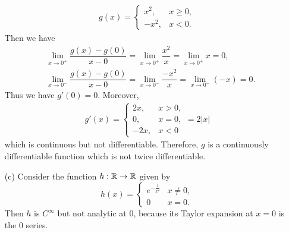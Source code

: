 \begin{problem}
\begin{solution}
\begin{itemize}
\begin{align*}
        g(x)=\begin{cases}
        x^2,&x\ge 0,\\
        -x^2,&x<0.
        \end{cases}
        \end{align*}
        Then we have 
        \begin{align*}
            &\lim_{x\rightarrow 0^+}\dfrac{g(x)-g(0)}{x-0}=\lim_{x\rightarrow 0^+}\dfrac{x^2}{x}=\lim_{x\rightarrow 0^+}x=0,\\
            &\lim_{x\rightarrow 0^-}\dfrac{g(x)-g(0)}{x-0}=\lim_{x\rightarrow 0^-}\dfrac{-x^2}{x}=\lim_{x\rightarrow 0^-}(-x)=0.
        \end{align*}
        Thus we have $g'(0)=0.$ Moreover,
        \begin{align*}
            g'(x)=\begin{cases}
            2x,&x>0,\\
            0,&x=0,\\
            -2x,&x<0
            \end{cases}=2|x|
        \end{align*}
        which is continuous but not differentiable. Therefore, $g$ is  a continuously differentiable function which is not twice differentiable.
        \item[(c)] Consider the function $h: \mathbb{R} \to \mathbb{R}$ given by
        $$ h(x) = \begin{cases}
        e^{-\frac{1}{x^2}} & x \neq 0, \\
        0 & x = 0.
        \end{cases} $$
        Then $h$ is $C^\infty$ but not analytic at 0, because its Taylor expansion at $x = 0$ is the 0 series.
\end{itemize}
\end{solution}
\end{problem}


